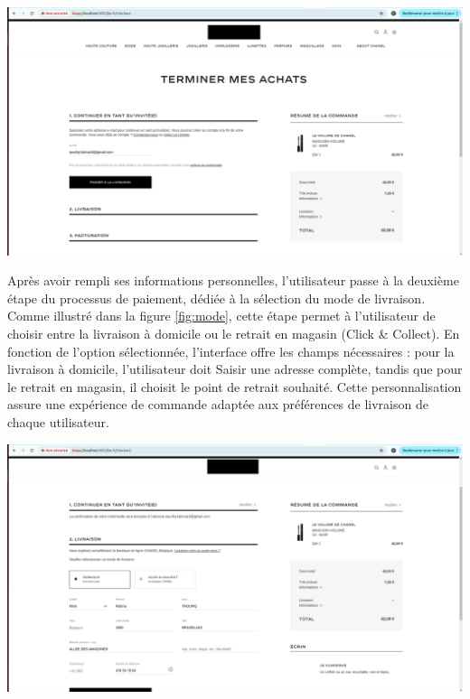 \begin{center}
    \centering
    \includegraphics[width=19cm]{Figures/Screens/ajout de l'email.png}
    \label{fig:saisie}
\end{center}
Après avoir rempli ses informations personnelles, l'utilisateur passe à la deuxième étape du processus de paiement, dédiée à la sélection du mode de livraison. Comme illustré dans la figure \ref{fig:mode}, cette étape permet à l'utilisateur de choisir entre la livraison à domicile ou le retrait en magasin (Click \& Collect). 
En fonction de l'option sélectionnée, l'interface offre les champs nécessaires : pour la livraison à domicile, l'utilisateur doit Saisir une adresse complète, tandis que pour le retrait en magasin, il choisit le point de retrait souhaité. Cette personnalisation assure une expérience de commande adaptée aux préférences de livraison de chaque utilisateur.
\begin{center}
    \centering
    \includegraphics[width=19cm]{Figures/Screens/Infos livraison.png}
    \label{fig:mode}
\end{center}
